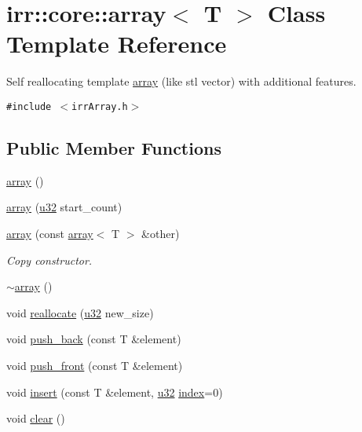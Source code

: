 \hypertarget{classirr_1_1core_1_1array}{
\section{irr::core::array$<$ T $>$ Class Template Reference}
\label{classirr_1_1core_1_1array}
}
Self reallocating template \hyperlink{classirr_1_1core_1_1array}{array} (like stl vector) with additional features.  


{\tt \#include $<$irrArray.h$>$}

\subsection*{Public Member Functions}
\begin{CompactItemize}
\item 
\hyperlink{classirr_1_1core_1_1array_d078049b519999658db99cd7838dc034}{array} ()
\item 
\hyperlink{classirr_1_1core_1_1array_cdf3e210bef431b4b789d616c6048b56}{array} (\hyperlink{namespaceirr_0416a53257075833e7002efd0a18e804}{u32} start\_\-count)
\item 
\hyperlink{classirr_1_1core_1_1array_ddc7b26c37e43024be3240344ef7ae4b}{array} (const \hyperlink{classirr_1_1core_1_1array}{array}$<$ T $>$ \&other)
\begin{CompactList}\small\item\em Copy constructor. \item\end{CompactList}\item 
\hyperlink{classirr_1_1core_1_1array_66774d7073dfe9794c1190b4a9fee73c}{$\sim$array} ()
\item 
void \hyperlink{classirr_1_1core_1_1array_1fa222a8692a1e2da94bc7e86b75cdae}{reallocate} (\hyperlink{namespaceirr_0416a53257075833e7002efd0a18e804}{u32} new\_\-size)
\item 
void \hyperlink{classirr_1_1core_1_1array_95afc36513d08abb51bd399755730877}{push\_\-back} (const T \&element)
\item 
void \hyperlink{classirr_1_1core_1_1array_27ce37ef9e34e55d4f9987c62deda9d6}{push\_\-front} (const T \&element)
\item 
void \hyperlink{classirr_1_1core_1_1array_7dd91405226e52db0c5a26add9f8e106}{insert} (const T \&element, \hyperlink{namespaceirr_0416a53257075833e7002efd0a18e804}{u32} \hyperlink{glext__bak_8h_57f14e05b1900f16a2da82ade47d0c6d}{index}=0)
\item 
void \hyperlink{classirr_1_1core_1_1array_611c70809111b608a103f86e004d6eb7}{clear} ()

\end{CompactItemize}
